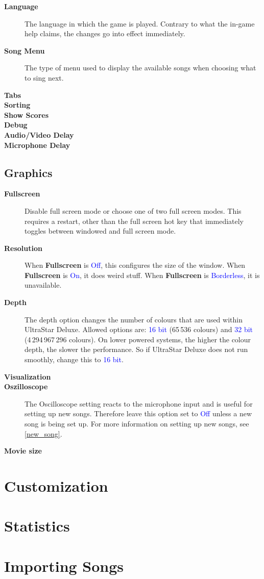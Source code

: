 \documentclass{scrreprt}
\newcommand*\menu[1]{\textsf{\textbf{#1}}}
\newenvironment*{menudescription}{%
	\newcommand*\entry[1]{\item[\menu{##1}]}
	\begin{description}
}{%
	\end{description}
}
\newcommand*\todomu[1]{\textcolor{blue}{#1}}
\begin{document}
\begin{menudescription}
\entry{Language}
	The language in which the game is played.
	Contrary to what the in-game help claims,
	the changes go into effect immediately.
\entry{Song Menu}
	The type of menu used to display the available songs
	when choosing what to sing next.
\entry{Tabs}
\entry{Sorting}
\entry{Show Scores}
\entry{Debug}
\entry{Audio/Video Delay}
\entry{Microphone Delay}
\end{menudescription}

\section{Graphics}

\begin{menudescription}
\entry{Fullscreen}
	Disable full screen mode or choose one of two full screen modes.
	This requires a restart,
	other than the full screen hot key
	that immediately toggles between windowed and full screen mode.
\entry{Resolution}
	When \menu{Fullscreen} is \todomu{Off},
	this configures the size of the window.
	When \menu{Fullscreen} is \todomu{On},
	it does weird stuff.
	When \menu{Fullscreen} is \todomu{Borderless},
	it is unavailable.
\entry{Depth}
	The depth option changes the number of colours
	that are used within UltraStar Deluxe.
	Allowed options are:
	\todomu{16 bit} (65\,536 colours)
	and \todomu{32 bit} (4\,294\,967\,296 colours).
	On lower powered systems,
	the higher the colour depth, the slower the performance.
	So if UltraStar Deluxe does not run smoothly,
	change this to \todomu{16 bit}.
\entry{Visualization}
\entry{Oszilloscope}
	The Oscilloscope setting reacts to the microphone input
	and is useful for setting up new songs.
	Therefore leave this option set to \todomu{Off}
	unless a new song is being set up.
	For more information on setting up new songs, see \ref{new_song}.
\entry{Movie size}
\end{menudescription}

\chapter{Customization}

\chapter{Statistics}

\chapter{Importing Songs}
\end{document}
